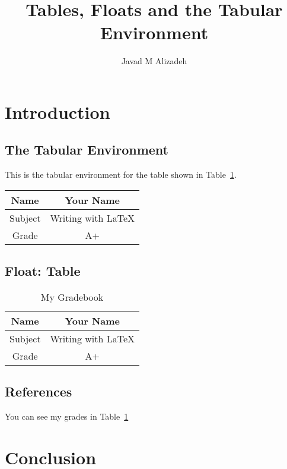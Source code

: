 \documentclass{article}
\title{Tables, Floats and the Tabular Environment}
\author{Javad M Alizadeh}
\date{}
\begin{document}
\maketitle
	
\section{Introduction}


\subsection{The Tabular Environment}

This is the tabular environment for the table shown in Table~\ref{tab:grades}.

\bigskip

\begin{tabular}{|c|c|}
	\hline
	Name & Your Name \\
	\hline
	Subject & Writing with \LaTeX \\
	\hline
	Grade & A+ \\
	\hline
\end{tabular}
	

\subsection{Float: Table}
\begin{table}[htbp]
	\caption{My Gradebook}
	\begin{center}
		\begin{tabular}{|c|c|}
			\hline
			Name & Your Name \\
			\hline
			Subject & Writing with \LaTeX \\
			\hline
			Grade & A+ \\
			\hline
		\end{tabular}
	\end{center}
	\label{tab:grades}		
\end{table}

\subsection{References}

You can see my grades in Table~\ref{tab:grades}	
	
\section{Conclusion}
	
	
\end{document}

